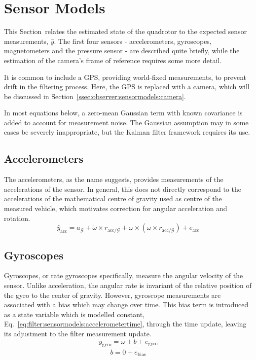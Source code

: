 \section{Sensor Models}
\label{sec:observer:sensormodels}
    This Section~relates the estimated state of the quadrotor to the expected sensor measurements, $\hat{y}$.
    The first four sensors - accelerometers, gyroscopes, magnetometers
    and the pressure sensor - are described quite briefly, while the
    estimation of the camera's frame of reference requires some more detail.

    It is common to include a GPS, providing world-fixed measurements,
    to prevent drift in the filtering process. Here, the GPS is replaced with a camera,
    which will be discussed in Section~\ref{ssec:observer:sensormodels:camera}.

    In most equations below, a zero-mean Gaussian term with known covariance is added
    to account for measurement noise. The Gaussian assumption may in some
    cases be severely inappropriate, but the Kalman filter framework requires its use.

    \subsection{Accelerometers}
        The accelerometers, as the name suggests, provides measurements of the
        accelerations of the sensor. In general, this does not directly correspond
        to the accelerations of the mathematical centre of gravity used
        as centre of the measured vehicle, which motivates correction
        for angular acceleration and rotation.
        \begin{equation}
            \hat{y}_{\text{acc}} = a_{\mathcal{G}} + \dot{\omega} \times r_{\text{acc}/\mathcal{G}} + \omega \times \left( \omega \times r_{\text{acc}/\mathcal{G}} \right) + e_{\text{acc}}
        \end{equation}

    \subsection{Gyroscopes}
        Gyroscopes, or rate gyroscopes specifically, measure the angular velocity
        of the sensor. Unlike acceleration, the angular rate is invariant of the
        relative position of the gyro to the center of gravity.
        However, gyroscope measurements are associated with a bias which may
        change over time. This bias term is introduced as a state variable which
        is modelled constant, Eq.~\eqref{eq:filter:sensormodels:accelerometertime},
        through the time update, leaving its adjustment to the filter measurement update.
        \begin{equation}
            y_{\text{gyro}} = \omega + b + e_{\text{gyro}}
        \end{equation}
        \begin{equation}
            \label{eq:filter:sensormodels:accelerometertime}
            \dot{b} = 0 + e_{\text{bias}}
        \end{equation}

